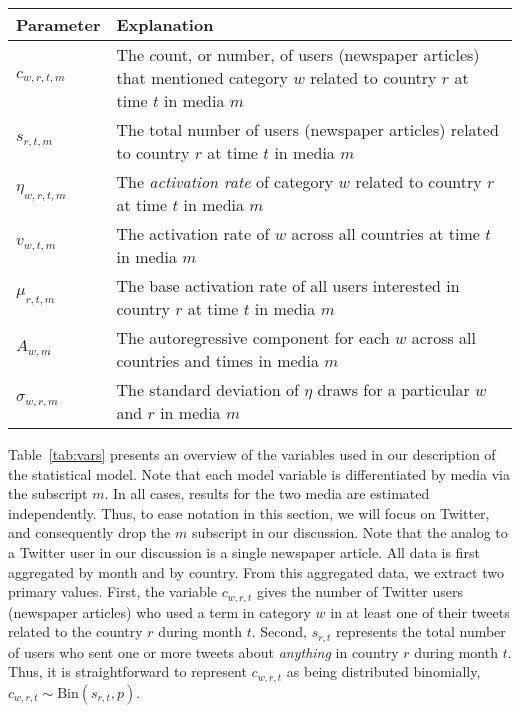 \begin{table*}[ht]
	\centering
	\begin{tabularx} {\textwidth}{ |l | X| }
	\hline 
		{\bf Parameter} & {\bf Explanation} \\ \hline 
		$c_{w,r,t,m}$ & The $c$ount, or number, of users (newspaper articles) that mentioned category $w$ related to country $r$ at time $t$ in media $m$ \\ \hline 
		$s_{r,t,m}$ & The total number of users (newspaper articles) related to country $r$ at time $t$ in media $m$  \\ \hline 
		$\eta_{w,r,t,m}$ & The \emph{activation rate} of category $w$ related to country $r$ at time $t $ in media $m$ \\ \hline 
		$v_{w,t,m}$ & The activation rate of $w$ across all countries at time $t$ in media $m$  \\ \hline
		$\mu_{r,t,m}$ & The base activation rate of all users interested in country $r$ at time $t$ in media $m$  \\ \hline
		$A_{w,m}$ & The autoregressive component for each $w$ across all countries and times in media $m$  \\ \hline
		$\sigma_{w,r,m}$ & The standard deviation of $\eta$ draws for a particular $w$ and $r$ in media $m$  \\ \hline
	\end{tabularx}
	\caption{table}
	\label{tab:vars}
\end{table*}

Table~\ref{tab:vars} presents an overview of the variables used in our description of the statistical model. Note that each model variable is differentiated by media via the subscript $m$. In all cases, results for the two media are estimated independently. Thus, to ease notation in this section, we will focus on Twitter, and consequently drop the $m$ subscript in our discussion.  Note that the analog to a Twitter user in our discussion is a single newspaper article. All data is first aggregated by month and by country.  From this aggregated data, we extract two primary values.  First, the variable $c_{w,r,t}$ gives the number of Twitter users (newspaper articles) who used a term in category $w$ in at least one of their tweets related to the country $r$ during month $t$.  Second, $s_{r,t}$ represents the total number of users who sent one or more tweets about \emph{anything} in country $r$ during month $t$.  Thus, it is straightforward to represent $c_{w,r,t}$ as being distributed binomially, $c_{w,r,t} \sim \text{Bin}(s_{r,t},p)$.


